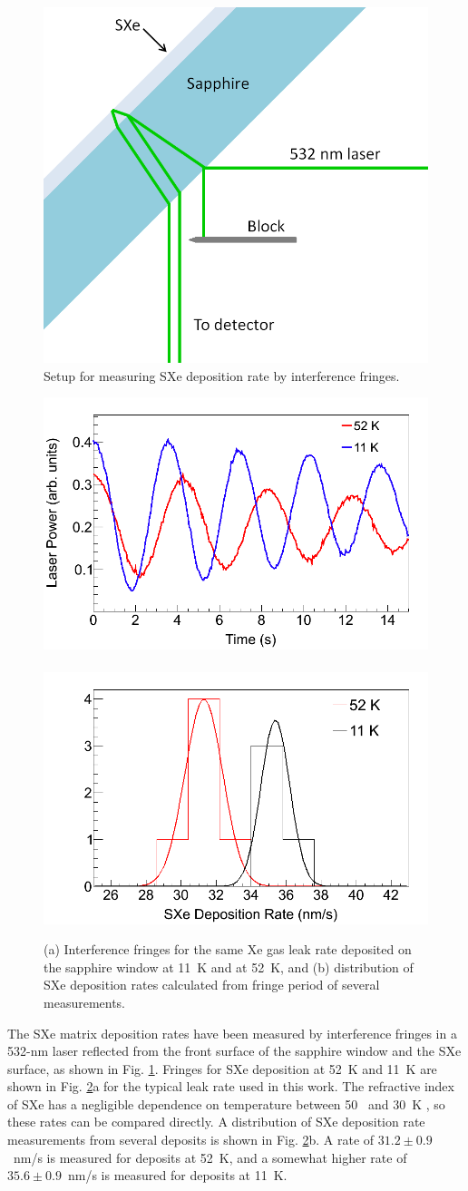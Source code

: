 \begin{figure} %
        \centering
                \includegraphics[width=.4\textwidth]{figures/fringe_setup.png}
                \caption{Setup for measuring SXe deposition rate by interference fringes.}
\label{fig:fringe_setup}
\end{figure}

\begin{figure} %
        \centering
                \includegraphics[width=.5\textwidth]{figures/fringes_52K_vs_11K.png}
                ~
                \includegraphics[width=.5\textwidth]{figures/fringes_52K_vs_11K_statistics.png}
                \caption{(a) Interference fringes for the same Xe gas leak rate deposited on the sapphire window at 11~K and at 52~K, and (b) distribution of SXe deposition rates calculated from fringe period of several measurements.}
\label{fig:fringes_52K_vs_11K}
\end{figure}

The SXe matrix deposition rates have been measured by interference fringes in a 532-nm laser reflected from the front surface of the sapphire window and the SXe surface, as shown in Fig. \ref{fig:fringe_setup}.  Fringes for SXe deposition at 52~K and 11~K are shown in Fig. \ref{fig:fringes_52K_vs_11K}a for the typical leak rate used in this work.  The refractive index of SXe has a negligible dependence on temperature between 50~ and 30~K \cite{SXeIndex}, so these rates can be compared directly.  A distribution of SXe deposition rate measurements from several deposits is shown in Fig. \ref{fig:fringes_52K_vs_11K}b.  A rate of $31.2 \pm 0.9$~nm/s is measured for deposits at 52~K, and a somewhat higher rate of $35.6 \pm 0.9$~nm/s is measured for deposits at 11~K.

